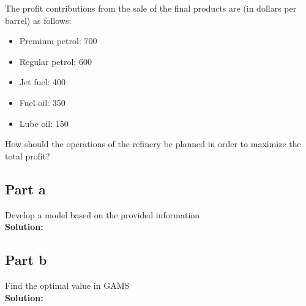 \documentclass[11pt]{article}
\begin{document}
The profit contributions from the sale of the final products are (in dollars per barrel) as follows:
\begin{itemize}
    \item Premium petrol: 700
    \item Regular petrol: 600
    \item Jet fuel: 400
    \item Fuel oil: 350
    \item Lube oil: 150
\end{itemize}

How should the operations of the refinery be planned in order to maximize the total profit?
\subsection{Part a}
Develop a model based on the provided information
\\
\textbf{Solution: }

\subsection{Part b}
Find the optimal value in GAMS
\\
\textbf{Solution: }
\end{document}
